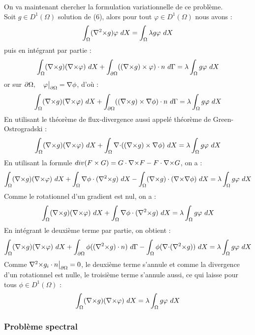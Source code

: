 On va maintenant chercher la formulation variationnelle de ce problème.\\
Soit $g\in D^1(\Omega)$ solution de (6), alors pour tout $\varphi\in D^1(\Omega)$ nous avons :
\[
\int_\Omega (\rott g)\varphi\ dX = \int_\Omega\lambda g\varphi\ dX
\]
puis en intégrant par partie :
\[
\int_\Omega (\rot g)(\rot\varphi)\ dX + \int_{\partial\Omega} ((\rot g)\times \varphi)\cdot n\ d\Gamma = \lambda\int_\Omega g\varphi\ dX
\]
or sur $\partial\Omega,\quad \varphi{\big\rvert_{\partial\Omega}}={\nabla}\phi$, d'où :
\[
\int_\Omega ({\nabla\times} g)({\nabla\times}\varphi)\ dX + \int_{\partial\Omega} (({\nabla\times} g)\times {\nabla}\phi)\cdot n\ d\Gamma = \lambda\int_\Omega g\varphi\ dX
\]
En utilisant le théorème de flux-divergence aussi appelé théorème de Green-Ostrogradski :
\[
\int_\Omega ({\nabla\times} g)({\nabla\times}\varphi)\ dX + \int_\Omega {\nabla\cdot}(({\nabla\times} g)\times {\nabla}\phi)\ dX = \lambda\int_\Omega g\varphi\ dX
\]
En utilisant la formule $div(F\times G) = G\cdot {\nabla\times} F - F\cdot {\nabla\times} G$, on a :
\[
\int_\Omega ({\nabla\times} g)({\nabla\times}\varphi)\ dX + \int_\Omega {\nabla}\phi\cdot({\nabla^2\times} g)\ dX -\int_\Omega ({\nabla\times} g)\cdot ({\nabla\times}{\nabla}\phi)\ dX  = \lambda\int_\Omega g\varphi\ dX
\]
Comme le rotationnel d'un gradient est nul, on a :
\[
\int_\Omega (\rot g)(\rot\varphi)\ dX + \int_\Omega \grad\phi\cdot(\rott g)\ dX  = \lambda\int_\Omega g\varphi\ dX
\]
En intégrant le deuxième terme par partie, on obtient :
\[
\int_\Omega ({\nabla\times} g)({\nabla\times}\varphi)\ dX + \int_{\partial\Omega} \phi(({\nabla^2\times} g)\cdot n)\ d\Gamma - \int_\Omega \phi({\nabla\cdot}({\nabla^2\times} g))\ dX  = \lambda\int_\Omega g\varphi\ dX
\]
Comme ${\nabla^2\times}  g_i\cdot n{\big\rvert_{\partial\Omega}} = 0$, le deuxième terme s'annule et comme la divergence d'un rotationnel est nulle, le troisième terme s'annule aussi, ce qui laisse pour tous $\phi\in D^1(\Omega)$ :
\begin{eqnarray}
\label{fveigen}
\int_\Omega ({\nabla\times} g)({\nabla\times}\varphi)\ dX = \lambda\int_\Omega g\varphi\ dX
\end{eqnarray}

\subsubsection{Problème spectral}
\label{spectre}

